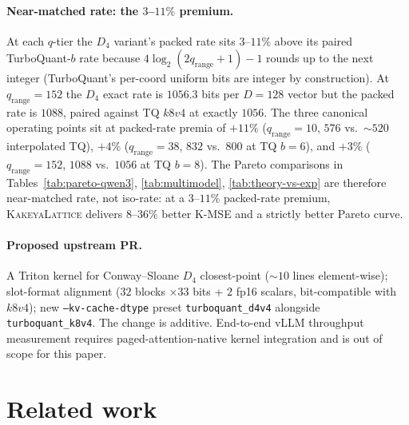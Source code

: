 \documentclass[10pt,a4paper]{article}
\theoremstyle{definition}
\theoremstyle{plain}
\begin{document}
\paragraph{Near-matched rate: the $3$--$11\%$ premium.}
\label{sec:tq-comp-bits}
At each $q$-tier the $D_4$ variant's packed rate sits $3$--$11\%$
above its paired TurboQuant-$b$ rate because
$4\log_2(2q_\mathrm{range}+1)-1$ rounds up to the next integer
(TurboQuant's per-coord uniform bits are integer by construction).
At $q_\mathrm{range}=152$ the $D_4$ exact rate is $1056.3$ bits
per $D=128$ vector but the packed rate is $1088$, paired against
TQ $k8v4$ at exactly $1056$. The three canonical operating points
sit at packed-rate premia of $+11\%$ ($q_\mathrm{range}=10$, $576$
vs.\ $\sim\!520$ interpolated TQ), $+4\%$ ($q_\mathrm{range}=38$,
$832$ vs.\ $800$ at TQ $b=6$), and $+3\%$ ($q_\mathrm{range}=152$,
$1088$ vs.\ $1056$ at TQ $b=8$). The Pareto comparisons in
Tables~\ref{tab:pareto-qwen3}, \ref{tab:multimodel},
\ref{tab:theory-vs-exp} are therefore near-matched rate, not
iso-rate: at a $3$--$11\%$ packed-rate premium,
\textsc{KakeyaLattice} delivers $8$--$36\%$ better K-MSE and a
strictly better Pareto curve.

\paragraph{Proposed upstream PR.}
A Triton kernel for Conway--Sloane $D_4$ closest-point
($\sim\!10$ lines element-wise); slot-format alignment ($32$
blocks $\times 33$ bits + $2$ fp16 scalars, bit-compatible with
$k8v4$); new \texttt{--kv-cache-dtype} preset
\texttt{turboquant\_d4v4} alongside \texttt{turboquant\_k8v4}. The
change is additive. End-to-end vLLM throughput measurement
requires paged-attention-native kernel integration and is out of
scope for this paper.
\section{Related work}
\label{sec:related}
\end{document}
